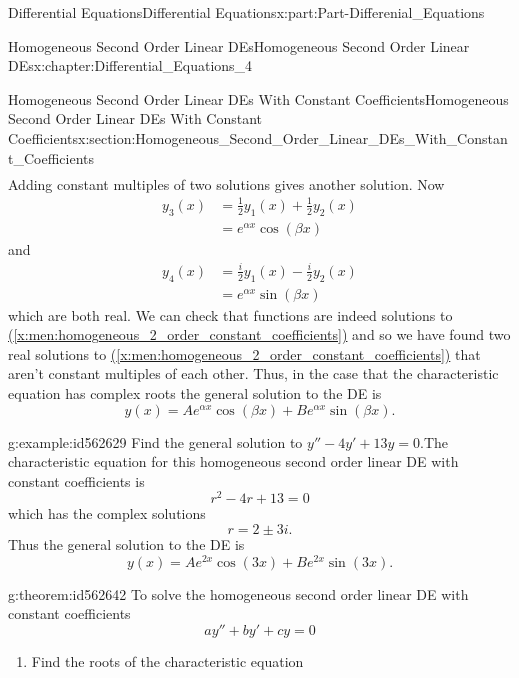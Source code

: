 \documentclass[oneside,10pt,]{book}
\newcommand{\xreffont}{\relax}
\numberwithin{equation}{section}
\newcommand{\amp}{&}
\begin{document}
\begin{partptx}{Differential Equations}{}{Differential Equations}{}{}{x:part:Part-Differenial_Equations}
\begin{chapterptx}{Homogeneous Second Order Linear DEs}{}{Homogeneous Second Order Linear DEs}{}{}{x:chapter:Differential_Equations_4}
\begin{sectionptx}{Homogeneous Second Order Linear DEs With Constant Coefficients}{}{Homogeneous Second Order Linear DEs With Constant Coefficients}{}{}{x:section:Homogeneous_Second_Order_Linear_DEs_With_Constant_Coefficients}
\begin{align*}
\end{align*}
Adding constant multiples of two solutions gives another solution. Now%
\begin{align*}
y_{3}(x) \amp =\frac{1}{2} y_{1}(x) + \frac{1}{2} y_{2}(x)  \\
\amp =e^{\alpha x} \cos(\beta x)  
\end{align*}
and%
\begin{align*}
y_{4}(x) \amp =\frac{i}{2} y_{1}(x) - \frac{i}{2} y_{2}(x)  \\
\amp =e^{\alpha x} \sin(\beta x)  
\end{align*}
which are both real. We can check that functions are indeed solutions to \hyperref[x:men:homogeneous_2_order_constant_coefficients]{({\xreffont\ref{x:men:homogeneous_2_order_constant_coefficients}})} and so we have found two real solutions to \hyperref[x:men:homogeneous_2_order_constant_coefficients]{({\xreffont\ref{x:men:homogeneous_2_order_constant_coefficients}})} that aren’t constant multiples of each other. Thus, in the case that the characteristic equation has complex roots the general solution to the DE is%
\begin{equation*}
y(x)=Ae^{\alpha x}\cos(\beta x) + B e^{\alpha x}\sin(\beta x).
\end{equation*}
%
\begin{example}{}{g:example:id562629}%
Find the general solution to \(y''-4y'+13y=0. \)The characteristic equation for this homogeneous second order linear DE with constant coefficients is%
\begin{equation*}
r^{2}-4r+13=0
\end{equation*}
which has the complex solutions%
\begin{equation*}
r=2\pm 3i.
\end{equation*}
Thus the general solution to the DE is%
\begin{equation*}
y(x)=Ae^{2 x}\cos(3 x) + B e^{2 x}\sin(3 x).
\end{equation*}
%
\end{example}
\begin{theorem}{}{}{g:theorem:id562642}%
To solve the homogeneous second order linear DE with constant coefficients%
\begin{equation}
ay''+by'+cy=0\label{x:men:homogeneous_2_order_constant_coefficients_Repeated_in_Theorem}
\end{equation}
%
\par
%
\begin{enumerate}[label=\roman*]
\item{}Find the roots of the characteristic equation%

\end{enumerate}
\end{theorem}
\end{sectionptx}
\end{chapterptx}
\end{partptx}
\end{document}
